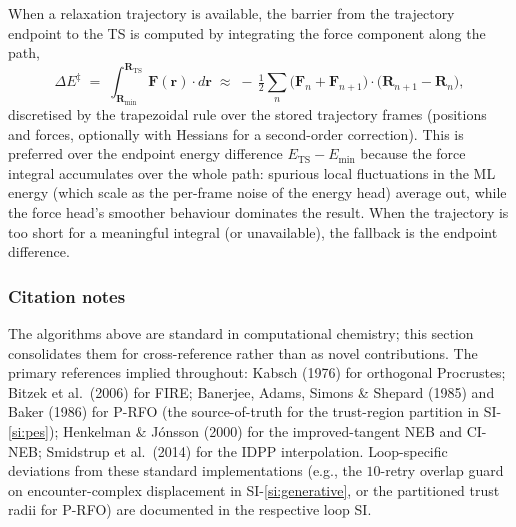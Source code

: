 When a relaxation trajectory is available, the barrier from the trajectory endpoint to the TS is computed by integrating the force component along the path,
\begin{equation}
    \Delta E^\ddagger \;=\; \int_{\mathbf{R}_\text{min}}^{\mathbf{R}_\text{TS}} \mathbf{F}(\mathbf{r}) \cdot d\mathbf{r}
    \;\approx\; -\,\tfrac{1}{2}\sum_{n} \bigl(\mathbf{F}_n + \mathbf{F}_{n+1}\bigr) \cdot \bigl(\mathbf{R}_{n+1} - \mathbf{R}_{n}\bigr),
\end{equation}
discretised by the trapezoidal rule over the stored trajectory frames (positions and forces, optionally with Hessians for a second-order correction). This is preferred over the endpoint energy difference $E_\text{TS} - E_\text{min}$ because the force integral accumulates over the whole path: spurious local fluctuations in the ML energy (which scale as the per-frame noise of the energy head) average out, while the force head's smoother behaviour dominates the result. When the trajectory is too short for a meaningful integral (or unavailable), the fallback is the endpoint difference.


\subsubsection{Citation notes}
\label{sec:shared-cites}

The algorithms above are standard in computational chemistry; this section consolidates them for cross-reference rather than as novel contributions. The primary references implied throughout: Kabsch (1976) for orthogonal Procrustes; Bitzek et al.\ (2006) for FIRE; Banerjee, Adams, Simons \& Shepard (1985) and Baker (1986) for P-RFO (the source-of-truth for the trust-region partition in SI-\ref{si:pes}); Henkelman \& J\'{o}nsson (2000) for the improved-tangent NEB and CI-NEB; Smidstrup et al.\ (2014) for the IDPP interpolation. Loop-specific deviations from these standard implementations (e.g., the $10$-retry overlap guard on encounter-complex displacement in SI-\ref{si:generative}, or the partitioned trust radii for P-RFO) are documented in the respective loop SI.


%

